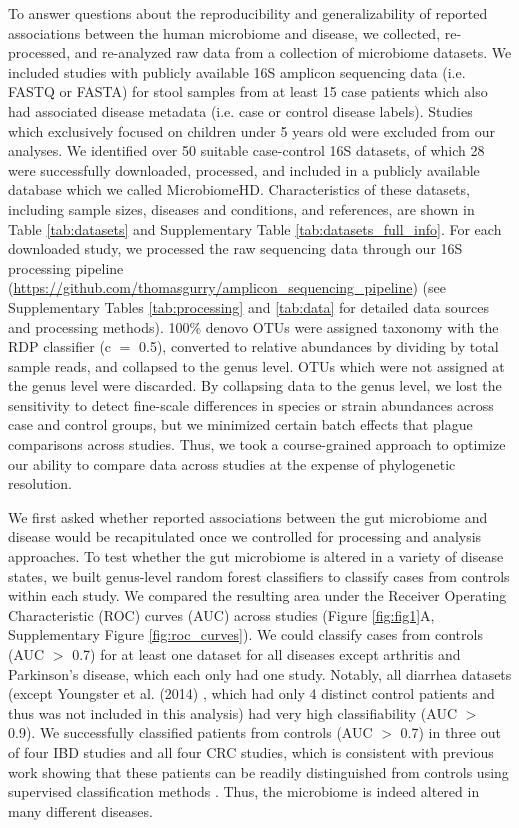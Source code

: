 To answer questions about the reproducibility and generalizability of reported associations between the human microbiome and disease, we collected, re-processed, and re-analyzed raw data from a collection of microbiome datasets.
We included studies with publicly available 16S amplicon sequencing data (i.e. FASTQ or FASTA) for stool samples from at least 15 case patients which also had associated disease metadata (i.e. case or control disease labels).
Studies which exclusively focused on children under 5 years old were excluded from our analyses.
We identified over 50 suitable case-control 16S datasets, of which 28 were successfully downloaded, processed, and included in a publicly available database which we called MicrobiomeHD\cite{microbiomehd}.
Characteristics of these datasets, including sample sizes, diseases and conditions, and references, are shown in Table \ref{tab:datasets} and Supplementary Table \ref{tab:datasets_full_info}.
For each downloaded study, we processed the raw sequencing data through our 16S processing pipeline (\url{https://github.com/thomasgurry/amplicon_sequencing_pipeline}) (see Supplementary Tables \ref{tab:processing} and \ref{tab:data} for detailed data sources and processing methods).
100\% denovo OTUs were assigned taxonomy with the RDP classifier \cite{wang2007naive} (c $=$ 0.5), converted to relative abundances by dividing by total sample reads, and collapsed to the genus level. OTUs which were not assigned at the genus level were discarded.
By collapsing data to the genus level, we lost the sensitivity to detect fine-scale differences in species or strain abundances across case and control groups, but we minimized certain batch effects that plague comparisons across studies.
Thus, we took a course-grained approach to optimize our ability to compare data across studies at the expense of phylogenetic resolution.

We first asked whether reported associations between the gut microbiome and disease would be recapitulated once we controlled for processing and analysis approaches.
To test whether the gut microbiome is altered in a variety of disease states, we built genus-level random forest classifiers to classify cases from controls within each study.
We compared the resulting area under the Receiver Operating Characteristic (ROC) curves (AUC) across studies (Figure \ref{fig:fig1}A, Supplementary Figure \ref{fig:roc_curves}).
We could classify cases from controls (AUC $>$ 0.7) for at least one dataset for all diseases except arthritis and Parkinson's disease, which each only had one study.
Notably, all diarrhea datasets (except Youngster et al. (2014) \cite{cdi-youngster}, which had only 4 distinct control patients and thus was not included in this analysis) had very high classifiability (AUC $>$ 0.9).
We successfully classified patients from controls (AUC $>$ 0.7) in three out of four IBD studies and all four CRC studies, which is consistent with previous work showing that these patients can be readily distinguished from controls using supervised classification methods \cite{walters2014meta,ibd-papa,crc-baxter,crc-zeller}.
Thus, the microbiome is indeed altered in many different diseases.

